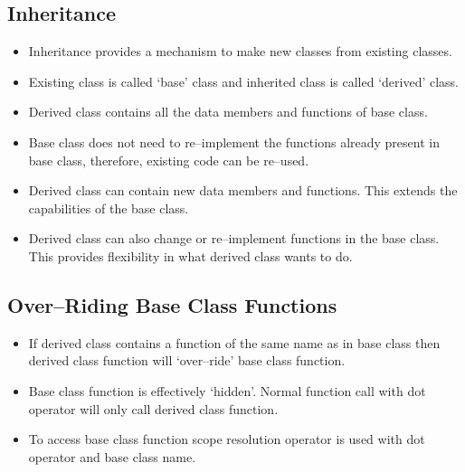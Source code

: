 \documentclass[12pt,a4paper]{article}
\begin{document}
\subsection{Inheritance}
\begin{itemize}
\item Inheritance provides a mechanism to make new classes from existing classes.
\item Existing class is called `base' class and inherited class is called `derived' class.
\item Derived class contains all the data members and functions of base class.
\item Base class does not need to re--implement the functions already present in base class, therefore, existing code can be re--used.
\item Derived class can contain new data members and functions. This extends the capabilities of the base class.
\item Derived class can also change or re--implement functions in the base class. This provides flexibility in what derived class wants to do.
\end{itemize}
\subsection{Over--Riding Base Class Functions}
\begin{itemize}
\item If derived class contains a function of the same name as in base class then derived class function will `over--ride' base class function.
\item Base class function is effectively `hidden'. Normal function call with dot operator will only call derived class function.
\item To access base class function scope resolution operator is used with dot operator and base class name.
\end{itemize}
\end{document}
